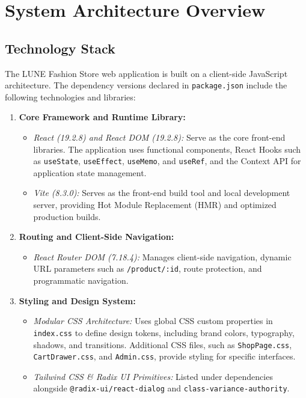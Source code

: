 \documentclass[12pt,a4paper,oneside]{report}
\begin{document}
\section{System Architecture Overview}

\subsection{Technology Stack}
The LUNE Fashion Store web application is built on a client-side JavaScript architecture. The dependency versions declared in \texttt{package.json} include the following technologies and libraries:
\begin{enumerate}[leftmargin=1.2cm]
    \item \textbf{Core Framework and Runtime Library:}
    \begin{itemize}[nosep]
        \item \textit{React (19.2.8) and React DOM (19.2.8):} Serve as the core front-end libraries. The application uses functional components, React Hooks such as \texttt{useState}, \texttt{useEffect}, \texttt{useMemo}, and \texttt{useRef}, and the Context API for application state management.
        \item \textit{Vite (8.3.0):} Serves as the front-end build tool and local development server, providing Hot Module Replacement (HMR) and optimized production builds.
    \end{itemize}
    \item \textbf{Routing and Client-Side Navigation:}
    \begin{itemize}[nosep]
        \item \textit{React Router DOM (7.18.4):} Manages client-side navigation, dynamic URL parameters such as \texttt{/product/:id}, route protection, and programmatic navigation.
    \end{itemize}
    \item \textbf{Styling and Design System:}
    \begin{itemize}[nosep]
        \item \textit{Modular CSS Architecture:} Uses global CSS custom properties in \texttt{index.css} to define design tokens, including brand colors, typography, shadows, and transitions. Additional CSS files, such as \texttt{ShopPage.css}, \texttt{CartDrawer.css}, and \texttt{Admin.css}, provide styling for specific interfaces.
        \item \textit{Tailwind CSS \& Radix UI Primitives:} Listed under dependencies alongside \texttt{@radix-ui/react-dialog} and \texttt{class-variance-authority}.

\end{itemize}
\end{enumerate}
\end{document}
